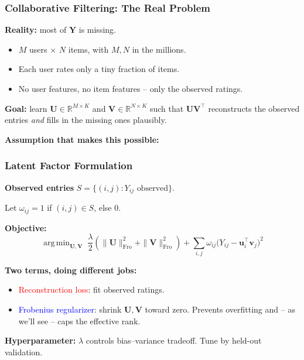 \documentclass[notes,11pt, aspectratio=169]{beamer}
\DeclareMathOperator*{\argmin}{arg\,min}
\newcommand{\vu}{\mathbf{u}}
\newcommand{\vv}{\mathbf{v}}
\newcommand{\vU}{\mathbf{U}}
\newcommand{\vV}{\mathbf{V}}
\newcommand{\vY}{\mathbf{Y}}
\newcommand{\R}{\mathbb{R}}
\newcommand{\Frob}{\mathrm{Fro}}
\begin{document}
\begin{frame}
\frametitle{Collaborative Filtering: The Real Problem}

\textbf{Reality:} most of $\vY$ is missing.

\vspace{6pt}
\begin{itemize}
    \item $M$ users $\times$ $N$ items, with $M, N$ in the millions.
    \item Each user rates only a tiny fraction of items.
    \item No user features, no item features -- only the observed ratings.
\end{itemize}

\vspace{8pt}
\textbf{Goal:} learn $\vU \in \R^{M \times K}$ and $\vV \in \R^{N \times K}$ such that $\vU \vV^\top$ reconstructs the observed entries \emph{and} fills in the missing ones plausibly.

\vspace{8pt}
\textbf{Assumption that makes this possible:}
\end{frame}

\begin{frame}
\frametitle{Latent Factor Formulation}

\textbf{Observed entries} $S = \{(i, j) : Y_{ij} \text{ observed}\}$.

\vspace{4pt}
Let $\omega_{ij} = 1$ if $(i,j) \in S$, else 0.

\vspace{8pt}
\textbf{Objective:}
\[
    \argmin_{\vU, \vV} \;
    \frac{\lambda}{2}\!\left(\|\vU\|_\Frob^2 + \|\vV\|_\Frob^2\right)
    + \sum_{i,j} \omega_{ij}\bigl(Y_{ij} - \vu_i^\top \vv_j\bigr)^2
\]

\vspace{6pt}
\textbf{Two terms, doing different jobs:}
\begin{itemize}
    \item \textcolor{red}{Reconstruction loss}: fit observed ratings.
    \item \textcolor{blue}{Frobenius regularizer}: shrink $\vU, \vV$ toward zero. Prevents overfitting and -- as we'll see -- caps the effective rank.
\end{itemize}

\vspace{6pt}
\textbf{Hyperparameter:} $\lambda$ controls bias--variance tradeoff. Tune by held-out validation.
\end{frame}
\end{document}
